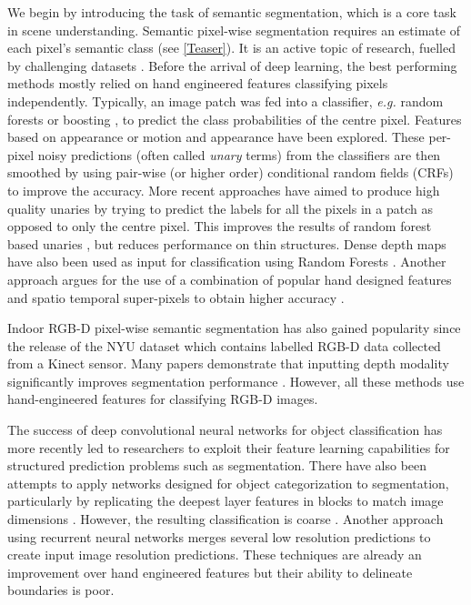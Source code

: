 We begin by introducing the task of semantic segmentation, which is a core task in scene understanding. Semantic pixel-wise segmentation requires an estimate of each pixel's semantic class (see \cref{Teaser}).
It is an active topic of research, fuelled by challenging datasets \citep{brostow2009semantic,silberman2012indoor,Geiger2012CVPR,pascal,song2015sun,Cordts2016Cityscapes}. Before the arrival of deep learning, the best performing methods mostly relied on hand engineered features classifying pixels independently. Typically, an image patch was fed into a classifier, \textit{e.g.} random forests \citep{Jamie2,brostow2008segmentation} or boosting \citep{Sturgess,LadickyECCV}, to predict the class probabilities of the centre pixel. Features based on appearance \citep{Jamie2} or motion and appearance \citep{brostow2008segmentation,Sturgess, LadickyECCV} have been explored. These per-pixel noisy predictions (often called \textit{unary} terms) from the classifiers are then smoothed by using pair-wise (or higher order) conditional random fields (CRFs) \citep{Sturgess,LadickyECCV} to improve the accuracy. More recent approaches have aimed to produce high quality unaries by trying to predict the labels for all the pixels in a patch as opposed to only the centre pixel. This improves the results of random forest based unaries \citep{kontschieder2011structured}, but reduces performance on thin structures. Dense depth maps have also been used as input for classification using Random Forests \citep{zhang2010semantic}. Another approach argues for the use of a combination of popular hand designed features and spatio temporal super-pixels to obtain higher accuracy \citep{tighe2013superparsing}.

Indoor RGB-D pixel-wise semantic segmentation has also gained popularity since the release of the NYU dataset \citep{silberman2012indoor} which contains labelled RGB-D data collected from a Kinect sensor. Many papers demonstrate that inputting depth modality significantly improves segmentation performance \citep{ren2012rgb,silberman2012indoor,Hermans14ICRA,gupta2013perceptual}. However, all these methods use hand-engineered features for classifying RGB-D images. 

The success of deep convolutional neural networks for object classification has more recently led to researchers to exploit their feature learning capabilities for structured prediction problems such as segmentation. There have also been attempts to apply networks designed for object categorization to segmentation, particularly by replicating the deepest layer features in blocks to match image dimensions \citep{FarabetPAMI,FarabetPurityCover,Grangier,Gatta}. However, the resulting classification is coarse \citep{Grangier}. Another approach using recurrent neural networks \citep{pinheiro2014recurrent} merges several low resolution predictions to create input image resolution predictions. These techniques are already an improvement over hand engineered features \citep{FarabetPAMI} but their ability to delineate boundaries is poor. 

